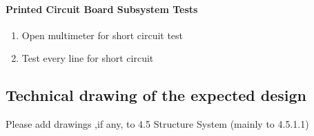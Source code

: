 \documentclass[a4paper,12pt]{article}
\begin{document}
	
	
	\paragraph{Printed Circuit Board Subsystem Tests}
	
	\begin{enumerate} 
		\item Open multimeter for short circuit test \vspace{-0.2cm}
		\item Test every line for short circuit
	\end{enumerate}
	
	
	
	
	


	\newpage
	
	\subsection{Technical drawing of the expected design}
	
	Please add drawings ,if any, to 4.5 Structure System (mainly to 4.5.1.1)
	
	
	
\end{document}
